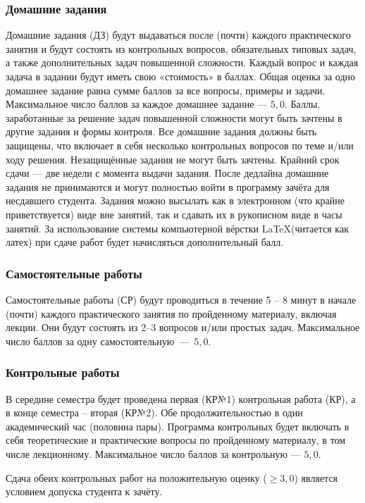 \documentclass[11pt, a4paper]{article}
\theoremstyle{plain}
\theoremstyle{definition}
\theoremstyle{remark}
\renewcommand{\geq}{\ensuremath{\geqslant}}
\begin{document}
\subsubsection{Домашние задания}
Домашние задания (ДЗ) будут выдаваться после (почти) каждого практического занятия и будут
состоять из контрольных вопросов, обязательных типовых задач, а также дополнительных задач
повышенной сложности. Каждый вопрос и каждая задача в задании будут иметь свою «стоимость» в баллах.
Общая оценка за одно домашнее задание равна сумме баллов за все вопросы, примеры и задачи.
Максимальное число баллов за каждое домашнее задание --- $5,0$. Баллы, заработанные за решение задач
повышенной сложности могут быть зачтены в другие задания и формы контроля. Все домашние задания
должны быть защищены, что включает в себя несколько контрольных вопросов по теме и/или ходу решения.
Незащищённые задания не могут быть зачтены. Крайний срок сдачи --- две недели с момента выдачи
задания. После дедлайна домашние задания не принимаются и могут полностью войти в программу зачёта
для несдавшего студента. Задания можно высылать как в электронном (что крайне приветствуется) виде
вне занятий, так и сдавать их в рукописном виде в часы занятий. За использование системы
компьютерной вёрстки \LaTeX (читается как латех) при сдаче работ будет начисляться дополнительный балл.

\subsubsection{Самостоятельные работы}
Самостоятельные работы (СР) будут проводиться в течение 5 -- 8 минут в начале (почти) каждого
практического занятия по пройденному материалу, включая лекции. Они будут состоять из 2--3 вопросов
и/или простых задач. Максимальное число баллов за одну самостоятельную~---~$5,0$. 

\subsubsection{Контрольные работы}
В середине семестра будет проведена первая (КР№1) контрольная работа (КР), а в конце семестра
-- вторая (КР№2). Обе продолжительностью в один академический час (половина пары). Программа
контрольных будет включать в себя теоретические и практические вопросы по пройденному материалу, в
том числе лекционному. Максимальное число баллов за контрольную --- $5,0$.\par
Сдача обеих контрольных работ на положительную оценку ($\geq 3,0$) является условием допуска 
студента к зачёту.
\end{document}
